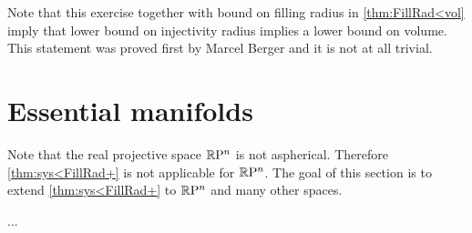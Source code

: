 Note that this exercise together with bound on filling radius in \ref{thm:FillRad<vol} imply that lower bound on injectivity radius implies a lower bound on volume.
This statement was proved first by Marcel Berger \cite{berger} and it is not at all trivial.

\section{Essential manifolds}

Note that the real projective space $\mathbb{R}\mathrm{P}^n$ is not aspherical.
Therefore \ref{thm:sys<FillRad+} is not applicable for $\mathbb{R}\mathrm{P}^n$.
The goal of this section is to extend \ref{thm:sys<FillRad+} to $\mathbb{R}\mathrm{P}^n$ and many other spaces.

...


